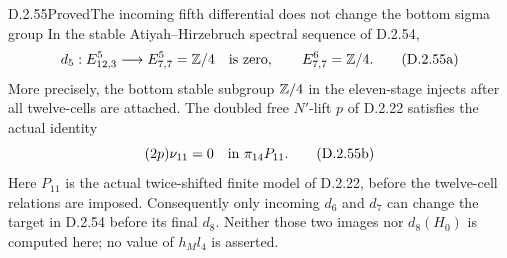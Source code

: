 \begin{claim}{D.2.55}{Proved}{The incoming fifth differential does not change the bottom sigma group}
In the stable Atiyah--Hirzebruch spectral sequence of D.2.54,
\[
 d_5:E^5_{12,3}\longrightarrow E^5_{7,7}=\mathbb Z/4
       \quad\hbox{is zero},\qquad E^6_{7,7}=\mathbb Z/4.
 \tag{D.2.55a}
\]
More precisely, the bottom stable subgroup $\mathbb Z/4$ in the
eleven-stage injects after all twelve-cells are attached.
The doubled free $N'$-lift $p$ of D.2.22 satisfies the actual
identity
\[
                         (2p)\nu_{11}=0
                         \quad\hbox{in }\pi_{14}P_{11}.
                         \tag{D.2.55b}
\]
Here $P_{11}$ is the actual twice-shifted finite model of
D.2.22, before the twelve-cell relations are imposed.
Consequently only incoming $d_6$ and $d_7$ can change the
target in D.2.54 before its final $d_8$.
Neither those two images nor $d_8(H_0)$ is computed here;
no value of $h_Ml_4$ is asserted.
\end{claim}
